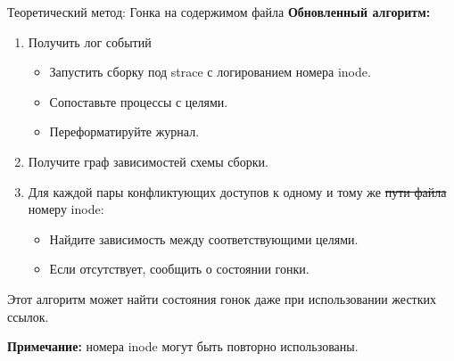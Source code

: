     \begin{frame}[label=current]{Теоретический метод: Гонка на содержимом файла}
        \textbf{Обновленный алгоритм:}
        \begin{enumerate}
            \item Получить лог событий

            \begin{itemize}
                \item Запустить сборку под strace \colorbox{diffadd}{с логированием номера inode.}
                \item Сопоставьте процессы с целями.
                \item Переформатируйте журнал.
            \end{itemize}
            \item Получите граф зависимостей схемы сборки.
            \item Для каждой пары конфликтующих доступов к одному и тому же \colorbox{diffrem}{\sout{\vphantom{fp}пути файла}}
            \colorbox{diffadd}{\vphantom{fp}номеру inode}:

            \begin{itemize}
                \item Найдите зависимость между соответствующими целями.
                \item Если отсутствует, сообщить о состоянии гонки.
            \end{itemize}
        \end{enumerate}

        Этот алгоритм может найти состояния гонок даже при использовании жестких ссылок.

        \textbf{Примечание:} номера inode могут быть повторно использованы.

    \end{frame}


